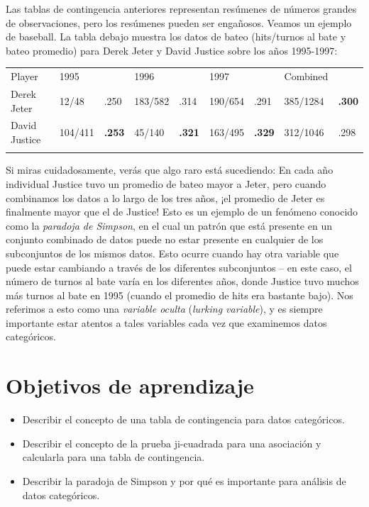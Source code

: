 \documentclass[
  12pt,
]{book}
\providecommand{\tightlist}{%
  \setlength{\itemsep}{0pt}\setlength{\parskip}{0pt}}
\theoremstyle{definition}
\theoremstyle{definition}
\theoremstyle{definition}
\theoremstyle{remark}
\begin{document}
Las tablas de contingencia anteriores representan resúmenes de números grandes de observaciones, pero los resúmenes pueden ser engañosos. Veamos un ejemplo de baseball. La tabla debajo muestra los datos de bateo (hits/turnos al bate y bateo promedio) para Derek Jeter y David Justice sobre los años 1995-1997:

\begin{longtable}[]{@{}lllllllll@{}}
\toprule
Player & 1995 & & 1996 & & 1997 & & Combined & \\ \addlinespace
\midrule
\endhead
Derek Jeter & 12/48 & .250 & 183/582 & .314 & 190/654 & .291 & 385/1284 & \textbf{.300} \\ \addlinespace
David Justice & 104/411 & \textbf{.253} & 45/140 & \textbf{.321} & 163/495 & \textbf{.329} & 312/1046 & .298 \\ \addlinespace
\bottomrule
\end{longtable}

Si miras cuidadosamente, verás que algo raro está sucediendo: En cada año individual Justice tuvo un promedio de bateo mayor a Jeter, pero cuando combinamos los datos a lo largo de los tres años, ¡el promedio de Jeter es finalmente mayor que el de Justice! Esto es un ejemplo de un fenómeno conocido como la \emph{paradoja de Simpson}, en el cual un patrón que está presente en un conjunto combinado de datos puede no estar presente en cualquier de los subconjuntos de los mismos datos. Esto ocurre cuando hay otra variable que puede estar cambiando a través de los diferentes subconjuntos -- en este caso, el número de turnos al bate varía en los diferentes años, donde Justice tuvo muchos más turnos al bate en 1995 (cuando el promedio de hits era bastante bajo). Nos referimos a esto como una \emph{variable oculta} (\emph{lurking variable}), y es siempre importante estar atentos a tales variables cada vez que examinemos datos categóricos.

\hypertarget{objetivos-de-aprendizaje}{%
\section{Objetivos de aprendizaje}\label{objetivos-de-aprendizaje}}

\begin{itemize}
\tightlist
\item
  Describir el concepto de una tabla de contingencia para datos categóricos.
\item
  Describir el concepto de la prueba ji-cuadrada para una asociación y calcularla para una tabla de contingencia.
\item
  Describir la paradoja de Simpson y por qué es importante para análisis de datos categóricos.
\end{itemize}
\end{document}
